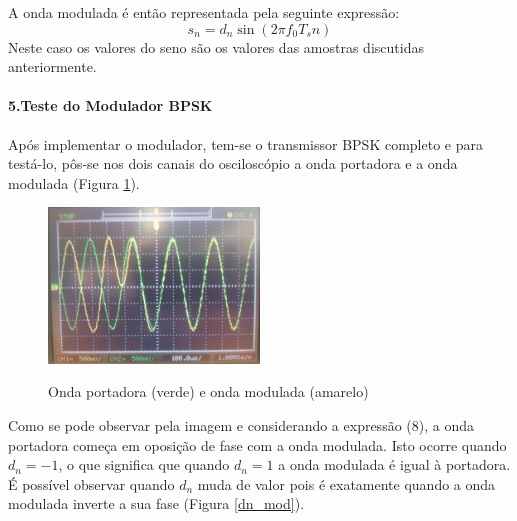 \documentclass[11pt]{article}
\numberwithin{equation}{section}
\begin{document}
A onda modulada é então representada pela seguinte expressão:
\begin{equation}
	s_n= d_n \sin(2 \pi f_0T_sn) 
\end{equation}
Neste caso os valores do seno são os valores das amostras discutidas anteriormente.
\vspace{2 mm}
                                              
\paragraph{5.Teste do Modulador BPSK} \hspace{0pt}

Após implementar o modulador, tem-se o transmissor BPSK completo e para testá-lo, pôs-se nos dois canais do osciloscópio a onda portadora e a onda modulada (Figura \ref{port_mod}).
\begin{figure}[H]
	\centering
	\includegraphics[width=0.5\textwidth]{./port_mod}~\\
	\caption{Onda portadora (verde) e onda modulada (amarelo)}
	\label{port_mod}
\end{figure} 
 \vspace{2 mm}
 
 Como se pode observar pela imagem e considerando a expressão (8), a onda portadora começa em oposição de fase com a onda modulada. Isto ocorre quando $d_n=-1$, o que significa que quando $d_n=1$ a onda modulada é igual à portadora. É possível observar quando $d_n$ muda de valor pois é exatamente quando a onda modulada inverte a sua fase (Figura \ref{dn_mod}). 
 
\end{document}
